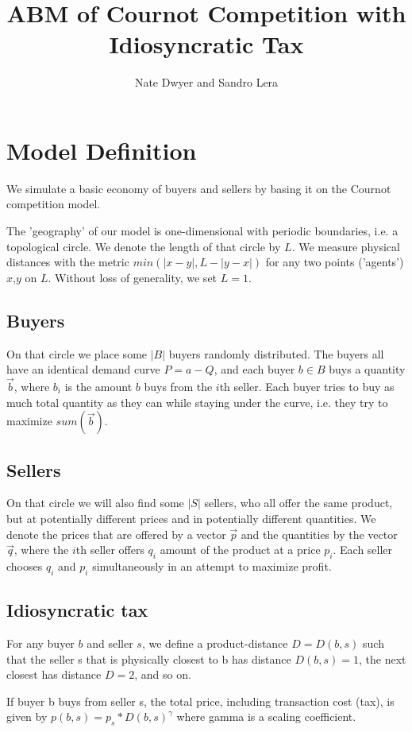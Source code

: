 \documentclass[14pt]{article}
\title{ABM of Cournot Competition with Idiosyncratic Tax}
\author{Nate Dwyer and Sandro Lera}
\begin{document}
\maketitle
\setcounter{section}{0}
\section{Model Definition}
We simulate a basic economy of buyers and sellers by basing it on the
Cournot competition model. 

The 'geography' of our model is one-dimensional with periodic boundaries, 
i.e. a topological circle. We denote the length of that circle by $L$. We 
measure physical distances with the metric $min(|x-y|, L-|y-x|)$ for 
any two points ('agents') $x$,$y$ on $L$. Without loss of generality,
we set $L=1$. 

\subsection{Buyers}
On that circle we place some $|B|$ buyers randomly distributed. The buyers
all have an identical demand curve $P=a-Q$, and each buyer $b\in B$ buys a 
quantity $\vec{b}$, where $b_i$ is the amount $b$ buys from the $i$th
seller. Each buyer tries to buy as much total quantity as they can while
staying under the curve, i.e. they try to maximize $sum(\vec{b})$. 

\subsection{Sellers}
On that circle we will also find some $|S|$ sellers, who all offer the same
product, but at potentially different prices and in potentially different
quantities. We denote the prices that are offered by a vector $\vec{p}$ and 
the quantities by the vector $\vec{q}$, where the $i$th seller offers $q_i$
amount of the product at a price $p_i$. Each seller chooses $q_i$ and $p_i$ 
simultaneously in an attempt to maximize profit.  

\subsection{Idiosyncratic tax}
For any buyer $b$ and seller $s$, we define a product-distance $D = D(b,s)$ 
such that the seller s that is physically closest to b has distance 
$D(b,s)=1$, the next closest has distance $D=2$, and so on. 

If buyer b buys from seller s, the total price, including transaction cost
(tax), is given by $p(b,s) = p_s *  D(b,s)^\gamma$ where gamma is a 
scaling coefficient. 
\end{document}
